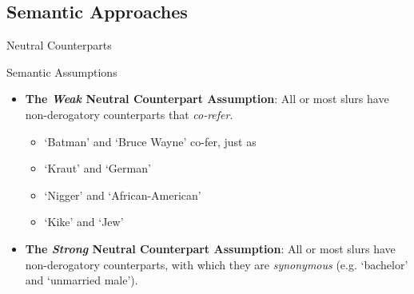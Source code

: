 \documentclass[xcolor=dvipsnames,12pt,handout]{beamer}
\begin{document}
\subsection{Semantic Approaches}
\begin{frame}{Neutral Counterparts}
\begin{block}{Semantic Assumptions}
\begin{itemize}
\pause
\item \textbf{The \textit{Weak} Neutral Counterpart Assumption}: All or most slurs have non-derogatory counterparts that \textit{co-refer}.
\pause
\begin{itemize} 
\item `Batman' and `Bruce Wayne' co-fer, just as
\pause
\item `Kraut' and `German'
\pause
\item `Nigger' and `African-American'
\pause
\item `Kike' and `Jew'
\end{itemize}
\medskip
\pause
\item \textbf{The \textit{Strong} Neutral Counterpart Assumption}: All or most slurs have non-derogatory counterparts, with which they are \textit{synonymous} (e.g. `bachelor' and `unmarried male').
\end{itemize}
\end{block}
\end{frame}

\end{document}
